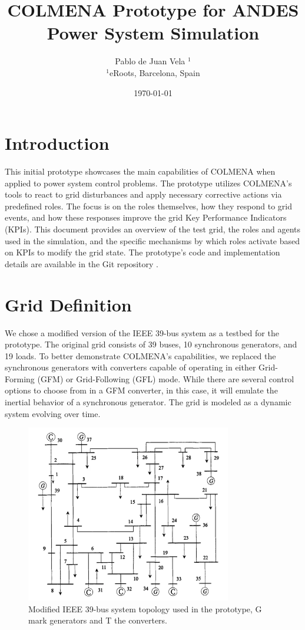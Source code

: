 \documentclass{article}
\title{COLMENA Prototype for ANDES Power System Simulation}
\author{Pablo de Juan Vela $^{1}$ \\
        \small $^{1}$eRoots, Barcelona, Spain \\
}
\date{\today}
\begin{document}
\maketitle

\section{Introduction}

This initial prototype showcases the main capabilities of COLMENA when applied to power system control problems. The prototype utilizes COLMENA's tools to react to grid disturbances and apply necessary corrective actions via predefined roles. The focus is on the roles themselves, how they respond to grid events, and how these responses improve the grid Key Performance Indicators (KPIs). This document provides an overview of the test grid, the roles and agents used in the simulation, and the specific mechanisms by which roles activate based on KPIs to modify the grid state. The prototype's code and implementation details are available in the Git repository \cite{git:eroots}.

\section{Grid Definition}

We chose a modified version of the IEEE 39-bus system \cite{grids:ieee39} as a testbed for the prototype. The original grid consists of 39 buses, 10 synchronous generators, and 19 loads. To better demonstrate COLMENA's capabilities, we replaced the synchronous generators with converters capable of operating in either Grid-Forming (GFM) or Grid-Following (GFL) mode. While there are several control options to choose from in a GFM converter, in this case, it will emulate the inertial behavior of a synchronous generator. The grid is modeled as a dynamic system evolving over time.
\begin{figure}[h]
    \centering
    \begin{center}
        \includegraphics[width=0.8\textwidth]{plots/IEEE39withtrafo.png}
    \end{center}
    \caption{Modified IEEE 39-bus system topology used in the prototype, G mark generators and T the converters.}
    \label{fig:ieee39_topology}
\end{figure}
\end{document}
